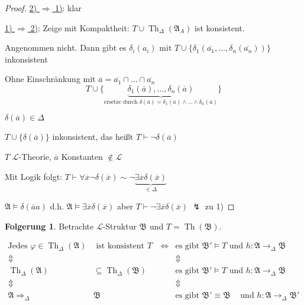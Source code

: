 \documentclass[12pt,parskip=full]{scrartcl}
\newcommand{\heading}{\underline}
\theoremstyle{definition}
\newtheorem{corollary}[theorem]{Folgerung}
\begin{document}
	\begin{proof}
		\heading{2) $\Rightarrow$ 1)}: klar
		
		\heading{1) $\Rightarrow$ 2)}: Zeige mit Kompaktheit: $T \cup \operatorname{Th}_\Delta(\mathfrak{A}_A)$ ist konsistent.
		
		Angenommen nicht. Dann gibt es $\delta_i(a_i)$ mit $T \cup \{ \delta_1(\overline{a_1}, \dots, \delta_n(\overline{a_n})) \}$ inkonsistent
		
		Ohne Einschränkung mit $\overline{a} = \overline{a_1} \cap \dots \cap \overline{a_n}$
		\begin{equation*}
			T \cup \{ \underbrace{\delta_1(\overline{a}), \dots, \delta_n(\overline{a})}_{\text{ersetze durch $\delta(\overline{a}) = \delta_1(\overline{a}) \land \dots \land \delta_n(\overline{a})$}} \}
		\end{equation*}
		
		$\delta(\overline{a}) \in \Delta$
		
		$T \cup \{ \delta(\overline{a}) \}$ inkonsistent, das heißt $T \vdash \lnot \delta(\overline{a})$
		
		$T$ $\mathcal{L}$-Theorie, $\overline{a}$ Konstanten $\notin \mathcal{L}$
		
		Mit Logik folgt: $T \vdash \forall \overline{x} \lnot \delta(\overline{x}) \sim \lnot \underbrace{\exists \overline{x} \delta(\overline{x})}_{\in \Delta}$
		
		$\mathfrak{A} \models \delta(\overline{a}a)$ d.h. $\mathfrak{A} \models \exists \overline{x} \delta(\overline{x})$ aber $T \vdash \lnot \exists \overline{x} \delta(\overline{x})$ $\lightning$ zu 1)
	\end{proof}

	\begin{corollary}
		Betrachte $\mathcal{L}$-Struktur $\mathfrak{B}$ und $T = \operatorname{Th}(\mathfrak{B})$.
		
		\begin{align*}
			\text{Jedes $\varphi \in \operatorname{Th}_\Delta(\mathfrak{A})$}&\text{ ist konsistent mit $T$} &&\Leftrightarrow& \text{es gibt $\mathfrak{B}' \models T$ und}&\text{ $h: \mathfrak{A} \to_\Delta \mathfrak{B}$} \\
			\Updownarrow& &&& \Updownarrow& \\
			\operatorname{Th}_\Delta(\mathfrak{A}) &\subseteq \operatorname{Th}_\Delta(\mathfrak{B}) &&& \text{es gibt $\mathfrak{B}' \models T$ und}&\text{ $h: \mathfrak{A} \to_\Delta \mathfrak{B}$} \\
			\Updownarrow& &&& \Updownarrow& \\
			\mathfrak{A} \Rightarrow_\Delta& \mathfrak{B} &&& \text{es gibt $\mathfrak{B}' \equiv \mathfrak{B}$ }&\text{und $h: \mathfrak{A} \to_\Delta \mathfrak{B}'$}
		\end{align*}
	\end{corollary}
\end{document}
